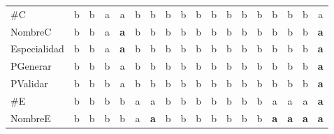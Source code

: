 {\begin{longtable}{lccccccccccccccccc}
\#C & \color{grisclaro}b & \color{grisclaro}b & a & a & \color{grisclaro}b & \color{grisclaro}b & \color{grisclaro}b & \color{grisclaro}b & \color{grisclaro}b & \color{grisclaro}b & \color{grisclaro}b & \color{grisclaro}b & \color{grisclaro}b & \color{grisclaro}b & \color{grisclaro}b & \color{grisclaro}b & a \\
NombreC & \color{grisclaro}b & \color{grisclaro}b & a & \textbf{\color{azuldos}a} & \color{grisclaro}b & \color{grisclaro}b & \color{grisclaro}b & \color{grisclaro}b & \color{grisclaro}b & \color{grisclaro}b & \color{grisclaro}b & \color{grisclaro}b & \color{grisclaro}b & \color{grisclaro}b & \color{grisclaro}b & \color{grisclaro}b & \textbf{\color{azuldos}a} \\
Especialidad & \color{grisclaro}b & \color{grisclaro}b & a & \textbf{\color{azuldos}a} & \color{grisclaro}b & \color{grisclaro}b & \color{grisclaro}b & \color{grisclaro}b & \color{grisclaro}b & \color{grisclaro}b & \color{grisclaro}b & \color{grisclaro}b & \color{grisclaro}b & \color{grisclaro}b & \color{grisclaro}b & \color{grisclaro}b & \textbf{\color{azuldos}a} \\
PGenerar & \color{grisclaro}b & \color{grisclaro}b & \color{grisclaro}b & a & \color{grisclaro}b & \color{grisclaro}b & \color{grisclaro}b & \color{grisclaro}b & \color{grisclaro}b & \color{grisclaro}b & \color{grisclaro}b & \color{grisclaro}b & \color{grisclaro}b & \color{grisclaro}b & \color{grisclaro}b & \color{grisclaro}b & \textbf{\color{azuldos}a} \\
PValidar & \color{grisclaro}b & \color{grisclaro}b & \color{grisclaro}b & a & \color{grisclaro}b & \color{grisclaro}b & \color{grisclaro}b & \color{grisclaro}b & \color{grisclaro}b & \color{grisclaro}b & \color{grisclaro}b & \color{grisclaro}b & \color{grisclaro}b & \color{grisclaro}b & \color{grisclaro}b & \color{grisclaro}b & \textbf{\color{azuldos}a} \\
\#E & \color{grisclaro}b & \color{grisclaro}b & \color{grisclaro}b & \color{grisclaro}b & a & a & \color{grisclaro}b & \color{grisclaro}b & \color{grisclaro}b & \color{grisclaro}b & \color{grisclaro}b & \color{grisclaro}b & \color{grisclaro}b & a & a & a & \textbf{\color{azuldos}a} \\
NombreE & \color{grisclaro}b & \color{grisclaro}b & \color{grisclaro}b & \color{grisclaro}b & a & \textbf{\color{azuldos}a} & \color{grisclaro}b & \color{grisclaro}b & \color{grisclaro}b & \color{grisclaro}b & \color{grisclaro}b & \color{grisclaro}b & \color{grisclaro}b & \textbf{\color{azuldos}a} & \textbf{\color{azuldos}a} & \textbf{\color{azuldos}a} & \textbf{\color{azuldos}a} \\

\end{longtable}}

